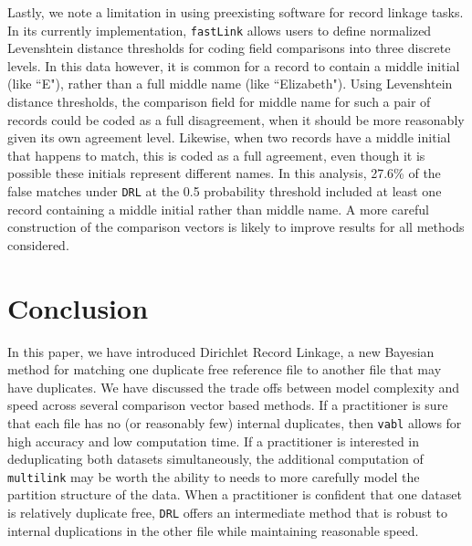 \documentclass[12pt,letterpaper]{article}
\newcommand{\1}[1]{\mathbb{I}\!\left[#1\right]} %
\begin{document}



Lastly, we note a limitation in using preexisting software for record linkage tasks. In its currently implementation, \texttt{fastLink} allows users to define normalized Levenshtein distance thresholds for coding field comparisons into three discrete levels. In this data however, it is common for a record to contain a middle initial (like ``E"), rather than a full middle name (like ``Elizabeth"). Using Levenshtein distance thresholds, the comparison field for middle name for such a pair of records could be coded as a full disagreement, when it should be more reasonably given its own agreement level. Likewise, when two records have a middle initial that happens to match, this is coded as a full agreement, even though it is possible these initials represent different names. In this analysis, 27.6\% of the false matches under \texttt{DRL} at the 0.5 probability threshold included at least one record containing a middle initial rather than middle name. A more careful construction of the comparison vectors is likely to improve results for all methods considered.

\section{Conclusion}\label{sec:conclusion}

In this paper, we have introduced Dirichlet Record Linkage, a new Bayesian method for matching one duplicate free reference file to another file that may have duplicates. We have discussed the trade offs between model complexity and speed across several comparison vector based methods. If a practitioner is sure that each file has no (or reasonably few) internal duplicates, then \texttt{vabl} allows for high accuracy and low computation time. If a practitioner is interested in deduplicating both datasets simultaneously, the additional computation of \texttt{multilink} may be worth the ability to needs to more carefully model the partition structure of the data. When a practitioner is confident that one dataset is relatively duplicate free, \texttt{DRL} offers an intermediate method that is robust to internal duplications in the other file while maintaining reasonable speed. 
\end{document}
